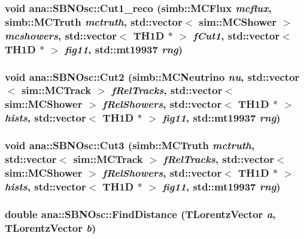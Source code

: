 \label{namespaceana_1_1SBNOsc_aee76a04c637ea0eabf24d70fa1fa93fa}
\hypertarget{namespaceana_1_1SBNOsc_ab43b2a2a21ac09029397875c621110b3}{
\subsubsection[{Cut1\_\-reco}]{\setlength{\rightskip}{0pt plus 5cm}void ana::SBNOsc::Cut1\_\-reco (simb::MCFlux {\em mcflux}, \/  simb::MCTruth {\em mctruth}, \/  std::vector$<$ sim::MCShower $>$ {\em mcshowers}, \/  std::vector$<$ TH1D $\ast$ $>$ {\em fCut1}, \/  std::vector$<$ TH1D $\ast$ $>$ {\em fig11}, \/  std::mt19937 {\em rng})}}
\label{namespaceana_1_1SBNOsc_ab43b2a2a21ac09029397875c621110b3}
\hypertarget{namespaceana_1_1SBNOsc_adaef1c3b82bf0bab423a70312245059f}{
\subsubsection[{Cut2}]{\setlength{\rightskip}{0pt plus 5cm}void ana::SBNOsc::Cut2 (simb::MCNeutrino {\em nu}, \/  std::vector$<$ sim::MCTrack $>$ {\em fRelTracks}, \/  std::vector$<$ sim::MCShower $>$ {\em fRelShowers}, \/  std::vector$<$ TH1D $\ast$ $>$ {\em hists}, \/  std::vector$<$ TH1D $\ast$ $>$ {\em fig11}, \/  std::mt19937 {\em rng})}}
\label{namespaceana_1_1SBNOsc_adaef1c3b82bf0bab423a70312245059f}
\hypertarget{namespaceana_1_1SBNOsc_a24094a24b2cf1d3e69b8c2be9530863d}{
\subsubsection[{Cut3}]{\setlength{\rightskip}{0pt plus 5cm}void ana::SBNOsc::Cut3 (simb::MCTruth {\em mctruth}, \/  std::vector$<$ sim::MCTrack $>$ {\em fRelTracks}, \/  std::vector$<$ sim::MCShower $>$ {\em fRelShowers}, \/  std::vector$<$ TH1D $\ast$ $>$ {\em hists}, \/  std::vector$<$ TH1D $\ast$ $>$ {\em fig11}, \/  std::mt19937 {\em rng})}}
\label{namespaceana_1_1SBNOsc_a24094a24b2cf1d3e69b8c2be9530863d}
\hypertarget{namespaceana_1_1SBNOsc_a3bcacb7d02055361a967634a2d0a4241}{
\subsubsection[{FindDistance}]{\setlength{\rightskip}{0pt plus 5cm}double ana::SBNOsc::FindDistance (TLorentzVector {\em a}, \/  TLorentzVector {\em b})}}
